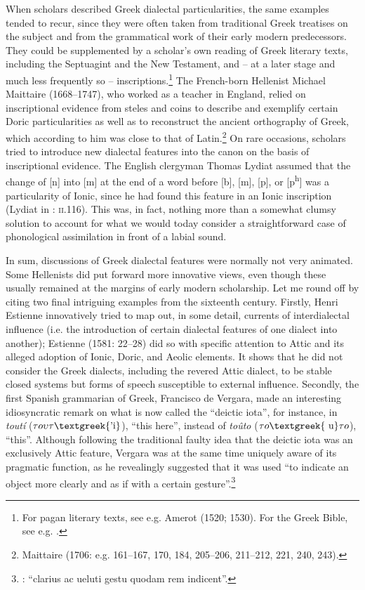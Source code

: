\documentclass[output=paper]{langsci/langscibook}
\begin{document}
When scholars described Greek dialectal particularities, the same examples tended to recur, since they were often taken from traditional Greek treatises on the subject and from the grammatical work of their early modern predecessors. They could be supplemented by a scholar’s own reading of Greek literary texts, including the Septuagint and the New Testament, and – at a later stage and much less frequently so – inscriptions.\footnote{For pagan literary texts, see e.g. Amerot (1520; 1530). For the Greek Bible, see e.g. \citet{Pasor1632}.} The French-born Hellenist Michael Maittaire (1668–1747), who worked as a teacher in England, relied on inscriptional evidence from steles and coins to describe and exemplify certain Doric particularities as well as to reconstruct the ancient orthography of Greek, which according to him was close to that of Latin.\footnote{Maittaire (1706: e.g. 161–167, 170, 184, 205–206, 211–212, 221, 240, 243).} On rare occasions, scholars tried to introduce new dialectal features into the canon on the basis of inscriptional evidence. The English clergyman Thomas Lydiat assumed that the change of [n] into [m] at the end of a word before [b], [m], [p], or [p\textsuperscript{h}] was a particularity of Ionic, since he had found this feature in an Ionic inscription (Lydiat in \citealt{Prideaux1676}: \textsc{ii}.116). This was, in fact, nothing more than a somewhat clumsy solution to account for what we would today consider a straightforward case of phonological assimilation in front of a labial sound.

In sum, discussions of Greek dialectal features were normally not very animated. Some Hellenists did put forward more innovative views, even though these usually remained at the margins of early modern scholarship. Let me round off by citing two final intriguing examples from the sixteenth century. Firstly, Henri Estienne innovatively tried to map out, in some detail, currents of interdialectal influence (i.e. the introduction of certain dialectal features of one dialect into another); Estienne (1581: 22–28) did so with specific attention to Attic and its alleged adoption of Ionic, Doric, and Aeolic elements. It shows that he did not consider the Greek dialects, including the revered Attic dialect, to be stable closed systems but forms of speech susceptible to external influence. Secondly, the first Spanish grammarian of Greek, Francisco de Vergara, made an interesting idiosyncratic remark on what is now called the “deictic iota”, for instance, in \textit{toutí} ($\tau o\upsilon \tau \text{\textgreek{'i}}$), “this here”, instead of \textit{toûto} ($\tau o\text{\textgreek{~u}}\tau o$), “this”. Although following the traditional faulty idea that the deictic iota was an exclusively Attic feature, Vergara was at the same time uniquely aware of its pragmatic function, as he revealingly suggested that it was used “to indicate an object more clearly and as if with a certain gesture”.\footnote{\citet[218]{Vergara1537}: “clarius ac ueluti gestu quodam rem indicent”.}
\end{document}
